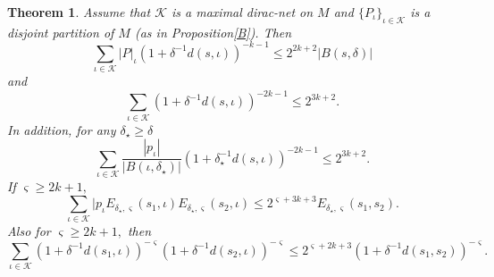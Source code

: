 \documentclass[10pt]{article}
\newtheorem{thm}{Theorem}[section]
\theoremstyle{definition}
\numberwithin{equation}{section}
\begin{document}
	\begin{thm}
		\normalfont
		Assume that $\mathcal{K}$ is a maximal dirac-net on $M$ and $\{P_{\iota} \}_{\iota \in \mathcal{K}}$ is a disjoint partition of $M$ (as in Proposition\eqref{B}). Then
		\begin{equation}\label{R}
			\sum_{\iota \in \mathcal{K}} |P|_{\iota} \left( 1+ \delta^{-1} d(s, \iota) \right)^{-k-1} \leq 2^{2k+2}|B(s, \delta)|
		\end{equation}
		and
		\begin{equation}\label{S}
			\sum_{\iota \in \mathcal{K}} \left( 1+ \delta^{-1} d(s, \iota) \right)^{-2k-1} \leq 2^{3k+2}.
		\end{equation}
		In addition, for any $\delta_{\star} \geq \delta$
		\begin{equation}\label{T}
			\sum_{\iota \in \mathcal{K}} \frac{|p_{\iota}|}{|B(\iota, \delta_{\star})|} \left( 1+ \delta_{\star}^{-1} d(s,\iota) \right)^{-2k-1} \leq 2^{3k+2}.
		\end{equation}
		If $ \varsigma \geq 2k + 1,$
		\begin{equation}\label{U}
			\sum_{\iota \in \mathcal{K}} |p_{\iota}E_{\delta_{\star},\varsigma}(s_1, \iota)E_{\delta_{\star},\varsigma}(s_2, \iota) \leq 2^{\varsigma + 3k + 3} E_{\delta_{\star},\varsigma}(s_1,s_2).
		\end{equation}
		Also for $ \varsigma \geq 2k + 1,$ then
		\begin{equation}\label{V}
			\sum_{\iota \in \mathcal{K}} \left( 1+ \delta^{-1} d(s_1, \iota) \right)^{- \varsigma} \left( 1+ \delta^{-1} d(s_2, \iota) \right)^{- \varsigma} \leq 2^{\varsigma + 2k + 3} \left( 1+ \delta^{-1} d(s_1,s_2) \right)^{- \varsigma}.
		\end{equation}
	\end{thm}
\end{document}
